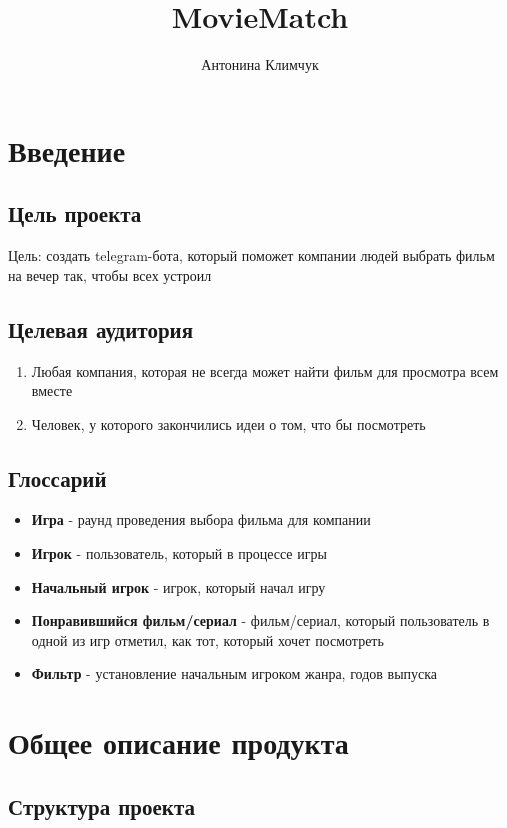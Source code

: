 \documentclass{article}
\title{MovieMatch}
\author{Антонина Климчук}
\date{}
\begin{document}
\maketitle


\section{Введение}

\subsection{Цель проекта}
Цель: создать telegram-бота, который поможет компании людей выбрать фильм на вечер так, чтобы всех устроил

\subsection{Целевая аудитория}
\begin{enumerate}
    \item Любая компания, которая не всегда может найти фильм для просмотра всем вместе
    \item Человек, у которого закончились идеи о том, что бы посмотреть
\end{enumerate}


\subsection{Глоссарий}
\begin{itemize}
    \item \textbf{Игра} - раунд проведения выбора фильма для компании
    \item \textbf{Игрок} - пользователь, который в процессе игры
    \item \textbf{Начальный игрок} - игрок, который начал игру
    \item \textbf{Понравившийся фильм/сериал} - фильм/сериал, который пользователь в одной из игр отметил, как тот, который хочет посмотреть
    \item \textbf{Фильтр} - установление начальным игроком жанра, годов выпуска

\end{itemize}
\newpage

\section{Общее описание продукта}

\subsection{Структура проекта}
\end{document}
